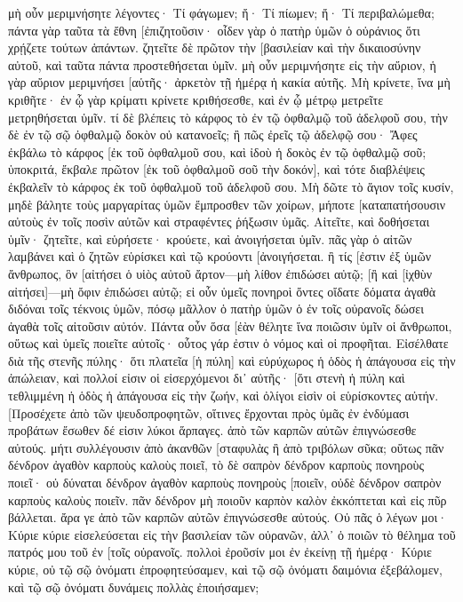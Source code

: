 μὴ οὖν μεριμνήσητε λέγοντες· Τί φάγωμεν; ἤ· Τί πίωμεν; ἤ· Τί περιβαλώμεθα; 
πάντα γὰρ ταῦτα τὰ ἔθνη [ἐπιζητοῦσιν· οἶδεν γὰρ ὁ πατὴρ ὑμῶν ὁ οὐράνιος ὅτι χρῄζετε τούτων ἁπάντων. 
ζητεῖτε δὲ πρῶτον τὴν [βασιλείαν καὶ τὴν δικαιοσύνην αὐτοῦ, καὶ ταῦτα πάντα προστεθήσεται ὑμῖν. 
μὴ οὖν μεριμνήσητε εἰς τὴν αὔριον, ἡ γὰρ αὔριον μεριμνήσει [αὑτῆς· ἀρκετὸν τῇ ἡμέρᾳ ἡ κακία αὐτῆς. 
Μὴ κρίνετε, ἵνα μὴ κριθῆτε· 
ἐν ᾧ γὰρ κρίματι κρίνετε κριθήσεσθε, καὶ ἐν ᾧ μέτρῳ μετρεῖτε μετρηθήσεται ὑμῖν. 
τί δὲ βλέπεις τὸ κάρφος τὸ ἐν τῷ ὀφθαλμῷ τοῦ ἀδελφοῦ σου, τὴν δὲ ἐν τῷ σῷ ὀφθαλμῷ δοκὸν οὐ κατανοεῖς; 
ἢ πῶς ἐρεῖς τῷ ἀδελφῷ σου· Ἄφες ἐκβάλω τὸ κάρφος [ἐκ τοῦ ὀφθαλμοῦ σου, καὶ ἰδοὺ ἡ δοκὸς ἐν τῷ ὀφθαλμῷ σοῦ; 
ὑποκριτά, ἔκβαλε πρῶτον [ἐκ τοῦ ὀφθαλμοῦ σοῦ τὴν δοκόν], καὶ τότε διαβλέψεις ἐκβαλεῖν τὸ κάρφος ἐκ τοῦ ὀφθαλμοῦ τοῦ ἀδελφοῦ σου. 
Μὴ δῶτε τὸ ἅγιον τοῖς κυσίν, μηδὲ βάλητε τοὺς μαργαρίτας ὑμῶν ἔμπροσθεν τῶν χοίρων, μήποτε [καταπατήσουσιν αὐτοὺς ἐν τοῖς ποσὶν αὐτῶν καὶ στραφέντες ῥήξωσιν ὑμᾶς. 
Αἰτεῖτε, καὶ δοθήσεται ὑμῖν· ζητεῖτε, καὶ εὑρήσετε· κρούετε, καὶ ἀνοιγήσεται ὑμῖν. 
πᾶς γὰρ ὁ αἰτῶν λαμβάνει καὶ ὁ ζητῶν εὑρίσκει καὶ τῷ κρούοντι [ἀνοιγήσεται. 
ἢ τίς [ἐστιν ἐξ ὑμῶν ἄνθρωπος, ὃν [αἰτήσει ὁ υἱὸς αὐτοῦ ἄρτον—μὴ λίθον ἐπιδώσει αὐτῷ; 
[ἢ καὶ [ἰχθὺν αἰτήσει]—μὴ ὄφιν ἐπιδώσει αὐτῷ; 
εἰ οὖν ὑμεῖς πονηροὶ ὄντες οἴδατε δόματα ἀγαθὰ διδόναι τοῖς τέκνοις ὑμῶν, πόσῳ μᾶλλον ὁ πατὴρ ὑμῶν ὁ ἐν τοῖς οὐρανοῖς δώσει ἀγαθὰ τοῖς αἰτοῦσιν αὐτόν. 
Πάντα οὖν ὅσα [ἐὰν θέλητε ἵνα ποιῶσιν ὑμῖν οἱ ἄνθρωποι, οὕτως καὶ ὑμεῖς ποιεῖτε αὐτοῖς· οὗτος γάρ ἐστιν ὁ νόμος καὶ οἱ προφῆται. 
Εἰσέλθατε διὰ τῆς στενῆς πύλης· ὅτι πλατεῖα [ἡ πύλη] καὶ εὐρύχωρος ἡ ὁδὸς ἡ ἀπάγουσα εἰς τὴν ἀπώλειαν, καὶ πολλοί εἰσιν οἱ εἰσερχόμενοι δι᾽ αὐτῆς· 
[ὅτι στενὴ ἡ πύλη καὶ τεθλιμμένη ἡ ὁδὸς ἡ ἀπάγουσα εἰς τὴν ζωήν, καὶ ὀλίγοι εἰσὶν οἱ εὑρίσκοντες αὐτήν. 
[Προσέχετε ἀπὸ τῶν ψευδοπροφητῶν, οἵτινες ἔρχονται πρὸς ὑμᾶς ἐν ἐνδύμασι προβάτων ἔσωθεν δέ εἰσιν λύκοι ἅρπαγες. 
ἀπὸ τῶν καρπῶν αὐτῶν ἐπιγνώσεσθε αὐτούς. μήτι συλλέγουσιν ἀπὸ ἀκανθῶν [σταφυλὰς ἢ ἀπὸ τριβόλων σῦκα; 
οὕτως πᾶν δένδρον ἀγαθὸν καρποὺς καλοὺς ποιεῖ, τὸ δὲ σαπρὸν δένδρον καρποὺς πονηροὺς ποιεῖ· 
οὐ δύναται δένδρον ἀγαθὸν καρποὺς πονηροὺς [ποιεῖν, οὐδὲ δένδρον σαπρὸν καρποὺς καλοὺς ποιεῖν. 
πᾶν δένδρον μὴ ποιοῦν καρπὸν καλὸν ἐκκόπτεται καὶ εἰς πῦρ βάλλεται. 
ἄρα γε ἀπὸ τῶν καρπῶν αὐτῶν ἐπιγνώσεσθε αὐτούς. 
Οὐ πᾶς ὁ λέγων μοι· Κύριε κύριε εἰσελεύσεται εἰς τὴν βασιλείαν τῶν οὐρανῶν, ἀλλ᾽ ὁ ποιῶν τὸ θέλημα τοῦ πατρός μου τοῦ ἐν [τοῖς οὐρανοῖς. 
πολλοὶ ἐροῦσίν μοι ἐν ἐκείνῃ τῇ ἡμέρᾳ· Κύριε κύριε, οὐ τῷ σῷ ὀνόματι ἐπροφητεύσαμεν, καὶ τῷ σῷ ὀνόματι δαιμόνια ἐξεβάλομεν, καὶ τῷ σῷ ὀνόματι δυνάμεις πολλὰς ἐποιήσαμεν; 
